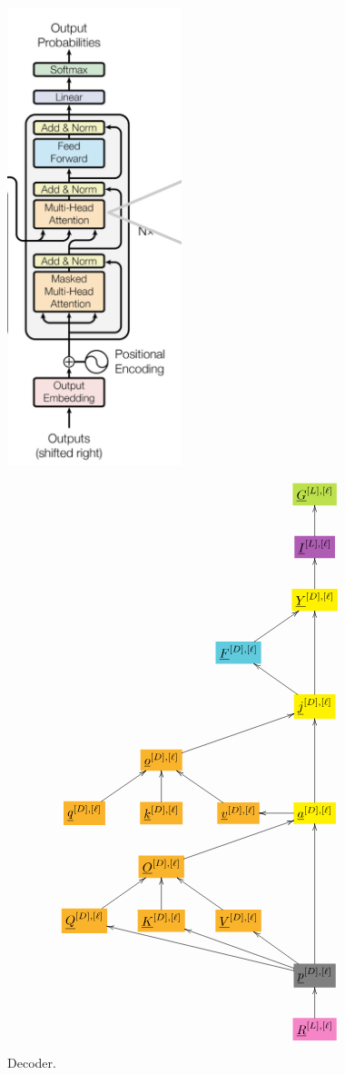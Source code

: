 \documentclass[12pt]{article}
\begin{document}
\begin{figure}[h!]\centering
\begin{minipage}{.5\linewidth}
\includegraphics[width=2in]{decoder.jpg}
\end{minipage}%
\begin{minipage}{.5\linewidth}
$$\xymatrix{
&&&*+[F*:SpringGreen]{\underline{G}^{[L],[\ell]}}
\\
&&&*+[F*:Orchid]{\underline{I}^{[L],[\ell]}}\ar[u]
\\
&&&*+[F*:yellow]{\underline{Y}^{[D], [\ell]}}\ar[u]
\\
&&*+[F*:SkyBlue]{\underline{F}^{[D], [\ell]}}\ar[ur]&
\\
&&&*+[F*:yellow]{\underline{j}^{[D], [\ell]}}\ar[ul]\ar[uu]
\\
&*+[F*:Dandelion]{\underline{o}^{[D],[\ell]}}\ar[urr]&&
\\
*+[F*:Dandelion]{\underline{q}^{[D], [\ell]}}\ar[ur]&*+[F*:Dandelion]{\underline{k}^{[D], [\ell]}}\ar[u]&*+[F*:Dandelion]{\underline{v}^{[D], [\ell]}}\ar[ul]&*+[F*:yellow]{\underline{a}^{[D], [\ell]}}\ar[uu]\ar[l]
\\
&*+[F*:Dandelion]{\underline{O}^{[D],[\ell]}}\ar[urr]&&
\\
*+[F*:Dandelion]{\underline{Q}^{[D], [\ell]}}\ar[ur]&*+[F*:Dandelion]{\underline{K}^{[D], [\ell]}}\ar[u]&*+[F*:Dandelion]{\underline{V}^{[D], [\ell]}}\ar[ul]&
\\
&&&*+[F*:gray]{\underline{p}^{[D],[\ell]}}\ar[ull]\ar[ulll]\ar[ul]\ar[uuu]
\\
&&&*+[F*:Lavender]{\underline{R}^{[L],[\ell]}}\ar[u]
}$$
\end{minipage}
\caption{Decoder.}
\label{fig-texnn-for-decoder}
\end{figure}
\end{document}
